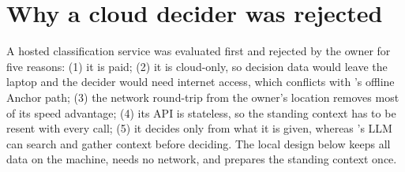 \section{Why a cloud decider was rejected}\label{sec:rejected}
A hosted classification service was evaluated first and rejected by the owner for five reasons: (1) it is paid; (2) it is cloud-only, so decision data would leave the laptop and the decider would need internet access, which conflicts with \sys{}'s offline Anchor path; (3) the network round-trip from the owner's location removes most of its speed advantage; (4) its API is stateless, so the standing context has to be resent with every call; (5) it decides only from what it is given, whereas \sys{}'s LLM can search and gather context before deciding. The local design below keeps all data on the machine, needs no network, and prepares the standing context once.
